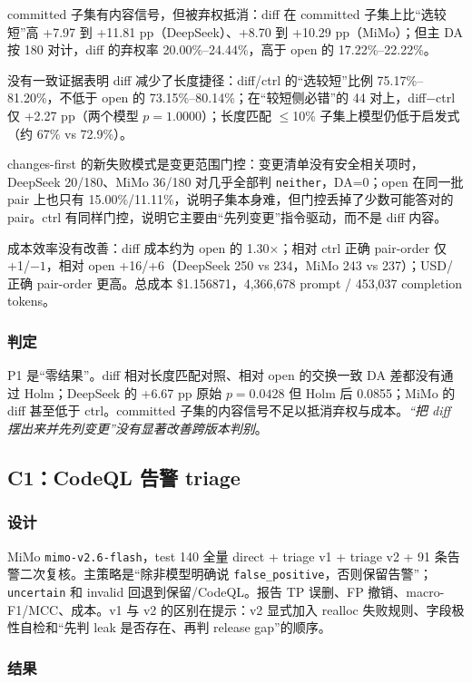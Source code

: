 \documentclass[conference]{IEEEtran}
\begin{document}
committed 子集有内容信号，但被弃权抵消：diff 在 committed 子集上比“选较短”高 +7.97 到 +11.81 pp（DeepSeek）、+8.70 到 +10.29 pp（MiMo）；但主 DA 按 180 对计，diff 的弃权率 20.00\%--24.44\%，高于 open 的 17.22\%--22.22\%。

没有一致证据表明 diff 减少了长度捷径：diff/ctrl 的“选较短”比例 75.17\%--81.20\%，不低于 open 的 73.15\%--80.14\%；在“较短侧必错”的 44 对上，diff$-$ctrl 仅 +2.27 pp（两个模型 $p=1.0000$）；长度匹配 $\le$10\% 子集上模型仍低于启发式（约 67\% vs 72.9\%）。

changes-first 的新失败模式是变更范围门控：变更清单没有安全相关项时，DeepSeek 20/180、MiMo 36/180 对几乎全部判 \texttt{neither}，DA=0；open 在同一批 pair 上也只有 15.00\%/11.11\%，说明子集本身难，但门控丢掉了少数可能答对的 pair。ctrl 有同样门控，说明它主要由“先列变更”指令驱动，而不是 diff 内容。

成本效率没有改善：diff 成本约为 open 的 1.30$\times$；相对 ctrl 正确 pair-order 仅 +1/$-1$，相对 open +16/+6（DeepSeek 250 vs 234，MiMo 243 vs 237）；USD/正确 pair-order 更高。总成本 \$1.156871，4{,}366{,}678 prompt / 453{,}037 completion tokens。

\subsubsection{判定}

P1 是“零结果”。diff 相对长度匹配对照、相对 open 的交换一致 DA 差都没有通过 Holm；DeepSeek 的 +6.67 pp 原始 $p=0.0428$ 但 Holm 后 0.0855；MiMo 的 diff 甚至低于 ctrl。committed 子集的内容信号不足以抵消弃权与成本。\emph{“把 diff 摆出来并先列变更”没有显著改善跨版本判别}。

\subsection{C1：CodeQL 告警 triage}
\label{sec:c1}

\subsubsection{设计}

MiMo \texttt{mimo-v2.6-flash}，test 140 全量 direct + triage v1 + triage v2 + 91 条告警二次复核。主策略是“除非模型明确说 \texttt{false\_positive}，否则保留告警”；\texttt{uncertain} 和 invalid 回退到保留/CodeQL。报告 TP 误删、FP 撤销、macro-F1/MCC、成本。v1 与 v2 的区别在提示：v2 显式加入 realloc 失败规则、字段极性自检和“先判 leak 是否存在、再判 release gap”的顺序。

\subsubsection{结果}
\end{document}
